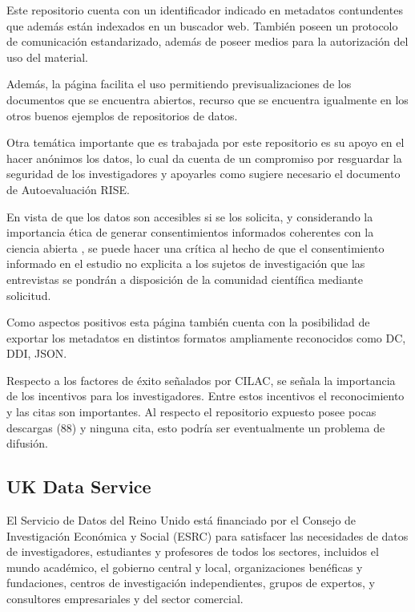 \documentclass[
  14pt,
]{book}
\begin{document}
Este repositorio cuenta con un identificador indicado en metadatos contundentes que además están indexados en un buscador web. También poseen un protocolo de comunicación estandarizado, además de poseer medios para la autorización del uso del material.

Además, la página facilita el uso permitiendo previsualizaciones de los documentos que se encuentra abiertos, recurso que se encuentra igualmente en los otros buenos ejemplos de repositorios de datos.

Otra temática importante que es trabajada por este repositorio es su apoyo en el hacer anónimos los datos, lo cual da cuenta de un compromiso por resguardar la seguridad de los investigadores y apoyarles como sugiere necesario el documento de Autoevaluación RISE.

En vista de que los datos son accesibles si se los solicita, y considerando la importancia ética de generar consentimientos informados coherentes con la ciencia abierta \citep{dennis_Privacy_2019}, se puede hacer una crítica al hecho de que el consentimiento informado en el estudio no explicita a los sujetos de investigación que las entrevistas se pondrán a disposición de la comunidad científica mediante solicitud.

Como aspectos positivos esta página también cuenta con la posibilidad de exportar los metadatos en distintos formatos ampliamente reconocidos como DC, DDI, JSON.

Respecto a los factores de éxito señalados por CILAC, se señala la importancia de los incentivos para los investigadores. Entre estos incentivos el reconocimiento y las citas son importantes. Al respecto el repositorio expuesto posee pocas descargas (88) y ninguna cita, esto podría ser eventualmente un problema de difusión.

\hypertarget{uk-data-service}{%
\subsection{UK Data Service}\label{uk-data-service}}

El Servicio de Datos del Reino Unido está financiado por el Consejo de Investigación Económica y Social (ESRC) para satisfacer las necesidades de datos de investigadores, estudiantes y profesores de todos los sectores, incluidos el mundo académico, el gobierno central y local, organizaciones benéficas y fundaciones, centros de investigación independientes, grupos de expertos, y consultores empresariales y del sector comercial.
\end{document}
